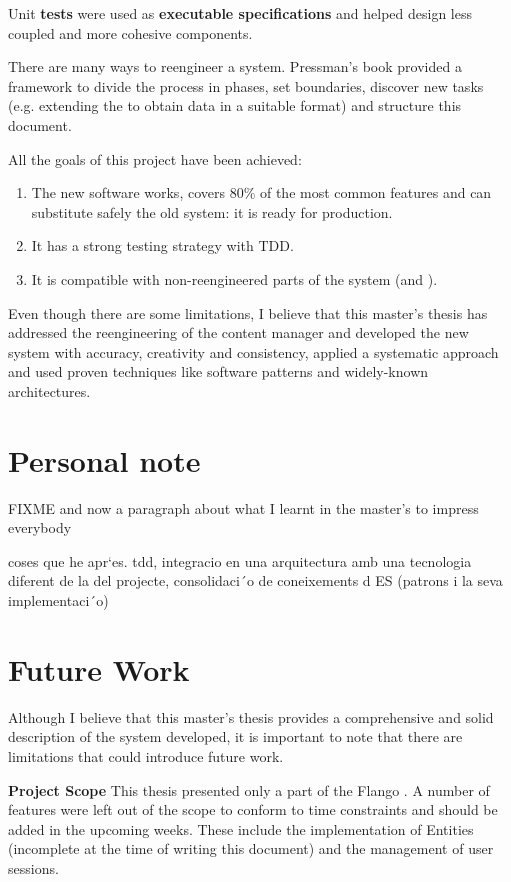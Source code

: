 Unit \textbf{tests} were used as \textbf{executable specifications} and helped design less coupled and more cohesive components.

There are many ways to reengineer a system.
Pressman's book provided a framework to divide the process in phases, set boundaries, discover new tasks (e.g. extending the \flangobe to obtain data in a suitable format) and structure this document.

All the goals of this project have been achieved:
\begin{enumerate}
\item The new software works, covers 80\% of the most common features and can substitute safely the old \flash system: it is ready for production.
\item It has a strong testing strategy with \ac{TDD}.
\item It is compatible with non-reengineered parts of the system (\flangobe and \flangofe).
\end{enumerate}

Even though there are some limitations, I believe that this master's thesis has addressed the reengineering of the content manager and developed the new system with accuracy, creativity and consistency, applied a systematic approach and used proven techniques like software patterns and widely-known architectures.


\section{Personal note}
FIXME and now a paragraph about what I learnt in the master's to impress everybody

coses que he apr`es.
tdd, integracio en una arquitectura amb una tecnologia diferent de la del projecte, consolidaci´o de coneixements d ES (patrons i la seva implementaci´o)


\section{Future Work}
Although I believe that this master's thesis provides a comprehensive and solid description of the system developed, it is important to note that there are limitations that could introduce future work.

\textbf{Project Scope} This thesis presented only a part of the Flango \cm . 
A number of features were left out of the scope to conform to time constraints and should be added in the upcoming weeks.
These include the implementation of Entities (incomplete at the time of writing this document) and the management of user sessions.


